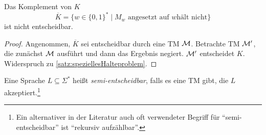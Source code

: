 \begin{Korollar}\label{kor:6.11}
    Das Komplement von $K$
  $$\overline{K} = \{w \in\{0,1\}^* \mid M_w\text{ angesetzt auf }w\text{
        hält nicht} \}$$
  ist nicht entscheidbar.
\end{Korollar}
\begin{proof}
	Angenommen, $\overline{K}$ sei entscheidbar durch eine \ac{TM} $\mathcal{M}$.
	Betrachte \ac{TM} $\mathcal{M}'$, die zunächst $\mathcal{M}$ ausführt und dann das Ergebnis negiert.
	$\mathcal{M}'$ entscheidet $K$.
	Widerspruch zu \autoref{satz:speziellesHalteproblem}.
\end{proof}




\begin{Def}[name={[Semi-Entscheidbarkeit]}]
	Eine Sprache $L\subseteq\Sigma^*$ heißt \emph{semi-entscheidbar}, falls es eine \ac{TM} gibt, die $L$ akzeptiert.\footnote{
	Ein alternativer in der Literatur auch oft verwendeter Begriff für "`semi-entscheidbar"' ist "`rekursiv aufzählbar"'.}
\end{Def}


